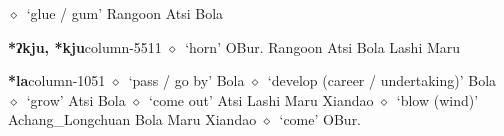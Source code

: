          $\diamond$~`glue / gum'
         Rangoon 
\hspace{1ex}
         Atsi 
\hspace{1ex}
         Bola 
  \item {\footnotesize \textbf{*ʔkju, *kju}}{\tiny column-5511}
         $\diamond$~`horn'
         OBur. 
\hspace{1ex}
         Rangoon 
\hspace{1ex}
         Atsi 
\hspace{1ex}
         Bola 
\hspace{1ex}
         Lashi 
\hspace{1ex}
         Maru 
  \item {\footnotesize \textbf{*la}}{\tiny column-1051}
         $\diamond$~`pass / go by'
         Bola 
\hspace{1ex}
         $\diamond$~`develop (career / undertaking)'
         Bola 
\hspace{1ex}
         $\diamond$~`grow'
         Atsi 
\hspace{1ex}
         Bola 
\hspace{1ex}
         $\diamond$~`come out'
         Atsi 
\hspace{1ex}
         Lashi 
\hspace{1ex}
         Maru 
\hspace{1ex}
         Xiandao 
\hspace{1ex}
         $\diamond$~`blow (wind)'
         Achang\_Longchuan 
\hspace{1ex}
         Bola 
\hspace{1ex}
         Maru 
\hspace{1ex}
         Xiandao 
\hspace{1ex}
         $\diamond$~`come'
         OBur. 
